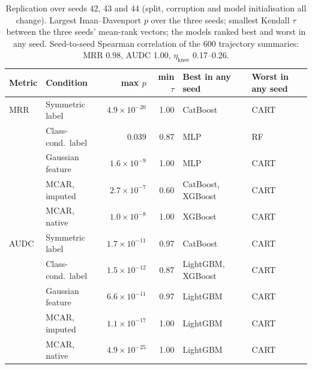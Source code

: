 \documentclass[pdflatex,sn-mathphys]{sn-jnl}
\theoremstyle{thmstyleone}
\begin{document}
\begin{table}[t]
\centering
\footnotesize
\setlength{\tabcolsep}{4pt}
\caption{Replication over seeds 42, 43 and 44 (split, corruption and model initialisation all change). Largest Iman--Davenport $p$ over the three seeds; smallest Kendall $\tau$ between the three seeds' mean-rank vectors; the models ranked best and worst in any seed. Seed-to-seed Spearman correlation of the 600 trajectory summaries: MRR 0.98, AUDC 1.00, $\eta_{\mathrm{knee}}$ 0.17--0.26.}
\label{tab:seeds}
\begin{tabular}{@{}llrrll@{}}
\toprule
Metric & Condition & max $p$ & min $\tau$ & Best in any seed & Worst in any seed \\
\midrule
MRR & Symmetric label & $4.9\times10^{-20}$ & 1.00 & CatBoost & CART \\
 & Class-cond.\ label & 0.039 & 0.87 & MLP & RF \\
 & Gaussian feature & $1.6\times10^{-9}$ & 1.00 & MLP & CART \\
 & MCAR, imputed & $2.7\times10^{-7}$ & 0.60 & CatBoost, XGBoost & CART \\
 & MCAR, native & $1.0\times10^{-8}$ & 1.00 & XGBoost & CART \\
\midrule
AUDC & Symmetric label & $1.7\times10^{-11}$ & 0.97 & CatBoost & CART \\
 & Class-cond.\ label & $1.5\times10^{-12}$ & 0.87 & LightGBM, XGBoost & CART \\
 & Gaussian feature & $6.6\times10^{-11}$ & 0.97 & LightGBM & CART \\
 & MCAR, imputed & $1.1\times10^{-17}$ & 1.00 & LightGBM & CART \\
 & MCAR, native & $4.9\times10^{-25}$ & 1.00 & LightGBM & CART \\
\bottomrule
\end{tabular}
\end{table}
\end{document}
